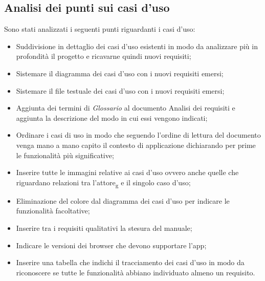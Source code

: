 \subsection{Analisi dei punti sui casi d'uso}
Sono stati analizzati i seguenti punti riguardanti i casi d'uso:
\begin{itemize}
    \item Suddivisione in dettaglio dei casi d'uso esistenti in modo da analizzare più in profondità il progetto e ricavarne quindi nuovi requisiti;
    \item Sistemare il diagramma dei casi d'uso con i nuovi requisiti emersi;
    \item Sistemare il file testuale dei casi d'uso con i nuovi requisiti emersi;
    \item Aggiunta dei termini di \textit{Glossario} al documento Analisi dei requisiti e aggiunta la descrizione del modo in cui essi vengono indicati;
    \item Ordinare i casi di uso in modo che seguendo l'ordine di lettura del documento venga mano a mano capito il contesto di applicazione dichiarando per prime le funzionalità più significative;
    \item Inserire tutte le immagini relative ai casi d'uso ovvero anche quelle che riguardano relazioni tra l'attore\textsubscript{g} e il singolo caso d'uso;
    \item Eliminazione del colore dal diagramma dei casi d'uso per indicare le funzionalità facoltative;
    \item Inserire tra i requisiti qualitativi la stesura del manuale;
    \item Indicare le versioni dei browser che devono supportare l'app;
    \item Inserire una tabella che indichi il tracciamento dei casi d'uso in modo da riconoscere se tutte le funzionalità abbiano individuato almeno un requisito.
\end{itemize}
